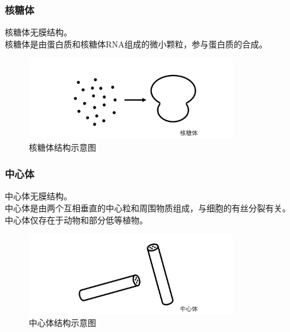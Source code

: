 \documentclass[UTF8]{ctexart}
\begin{document}
\newpage

\subsubsection{核糖体}
    核糖体无膜结构。\\[2mm]
    核糖体是由蛋白质和核糖体RNA组成的微小颗粒，参与蛋白质的合成。\vspace{-10pt}
    \begin{figure}[h!]
        \begin{center}
            \includegraphics[width=9cm]{BiologyImage/4.jpg}
            \caption{核糖体结构示意图}
        \end{center}
    \end{figure}\vspace{-32.5pt}

\subsubsection{中心体}
    中心体无膜结构。\\[2mm]
    中心体是由两个互相垂直的中心粒和周围物质组成，与细胞的有丝分裂有关。\\[2mm]
    中心体仅存在于动物和部分低等植物。\vspace{-10pt}
    \begin{figure}[h!]
        \begin{center}
            \includegraphics[width=9cm]{BiologyImage/9.jpg}
            \caption{中心体结构示意图}
        \end{center}
    \end{figure}\vspace{-32.5pt}
\end{document}
